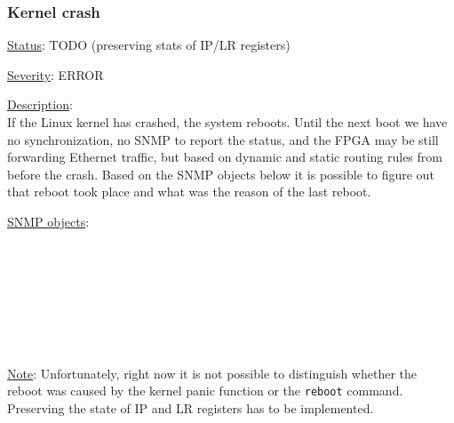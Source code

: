 \subsubsection{\bf Kernel crash}
		\begin{pck_descr}
      \item [] \underline{Status}: TODO (preserving stats of IP/LR registers)
			\item [] \underline{Severity}: ERROR
			\item [] \underline{Description}:\\
				If the Linux kernel has crashed, the system reboots. Until the next boot
        we have no synchronization, no SNMP to report the status, and the FPGA
        may be still forwarding Ethernet traffic, but based on dynamic and
        static routing rules from before the crash. Based on the SNMP objects
        below it is possible to figure out that reboot took place and what was
        the reason of the last reboot.
			\item [] \underline{SNMP objects}:\\
        {\footnotesize
				\\
				\\
				\\
				\\
				\\
				\\
				\\
         }
			\item [] \underline{Note}:
				Unfortunately, right now it is not possible to distinguish whether the
				reboot was caused by the kernel panic function or the \texttt{reboot}
				command. Preserving the state of IP and LR registers has to be
				implemented.
		\end{pck_descr}
